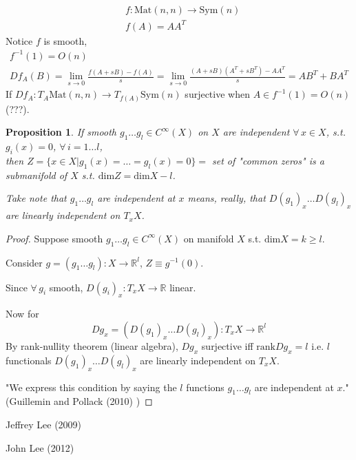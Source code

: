 \documentclass[10pt]{amsart}
\newtheorem{proposition}{Proposition}
\begin{document}
\begin{multicols*}{2}
\[
\begin{aligned}
	& f:\text{Mat}(n,n) \to \text{Sym}(n) \\
	& f(A) = AA^T
\end{aligned}
\]
Notice $f$ is smooth, 
\[
\begin{gathered}
f^{-1}(1) = O(n) \\
Df_A(B) = \lim_{s\to 0} \frac{ f(A+sB) - f(A) }{s} = \lim_{s\to 0} \frac{(A+sB)(A^T + sB^T)- AA^T}{s} = AB^T +BA^T
\end{gathered}
\]
If $Df_A : T_A\text{Mat}(n,n) \to T_{f(A)}\text{Sym}(n)$ surjective when $A\in f^{-1}(1) = O(n)$ (???).  





\begin{proposition} If smooth $g_1\dots g_l \in C^{\infty}(X)$ on $X$ are independent $\forall \, x\in X$, s.t. $g_i(x)=0$, $\forall \, i = 1\dots l$, \\
	then $Z=\lbrace x\in X | g_1(x) = \dots = g_l(x)=0 \rbrace = $ set of "common zeros" is a \emph{submanifold} of $X$ s.t. $\text{dim}Z = \text{dim}X- l$.  
	
	Take \emph{note} that $g_1 \dots g_l$ are independent at $x$ means, really, that $D(g_1)_x \dots D(g_l)_x$ are linearly independent on $T_xX$.  
\end{proposition}
\begin{proof}
Suppose smooth $g_1 \dots g_l \in C^{\infty}(X)$ on manifold $X$ s.t. $\text{dim}X = k\geq l$.  

Consider $g=(g_1\dots g_l):X \to \mathbb{R}^l$, $Z\equiv g^{-1}(0)$.  

Since $\forall \, g_i$ smooth, $D(g_i)_x:T_xX \to \mathbb{R}$ linear.  

Now for 
\[
Dg_x = (D(g_1)_x \dots D(g_l)_x):T_xX \to \mathbb{R}^l
\]	
By rank-nullity theorem (linear algebra), $Dg_x$ surjective iff $\text{rank}Dg_x = l$ i.e. $l$ functionals $D(g_1)_x \dots D(g_l)_x$ are linearly independent on $T_xX$.  

"We express this condition by saying the $l$ functions $g_1\dots g_l$ are independent at $x$."  (Guillemin and Pollack (2010) \cite{VGuilleminAPollack2010})  
	
	
	\end{proof}




Jeffrey Lee (2009) \cite{JLee2009}



John Lee (2012) \cite{JLee2012}



\end{multicols*}
\end{document}
